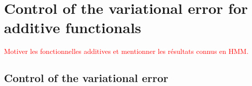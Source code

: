 \documentclass{article}
\begin{document}

\section{Control of the variational error for additive functionals}
\textcolor{red}{Motiver les fonctionnelles additives et mentionner les r\'esultats connus en HMM.}
\subsection{Control of the variational error}
\end{document}
